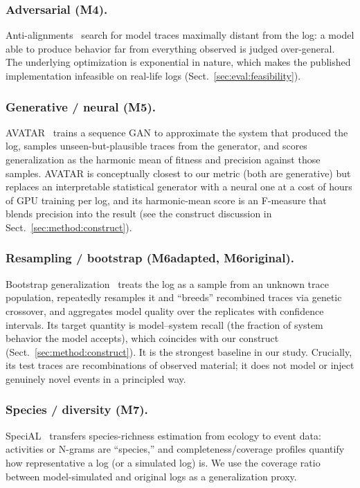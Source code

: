 \documentclass[runningheads]{llncs}
\begin{document}
\subsubsection{Adversarial (M4).}
Anti-alignments~\cite{vandongen2016anti} search for model traces maximally distant from the log: a model able to produce behavior far from everything observed is judged over-general. The underlying optimization is exponential in nature, which makes the published implementation infeasible on real-life logs (Sect.~\ref{sec:eval:feasibility}).

\subsubsection{Generative / neural (M5).}
AVATAR~\cite{theis2020avatar} trains a sequence GAN to approximate the system that produced the log, samples unseen-but-plausible traces from the generator, and scores generalization as the harmonic mean of fitness and precision against those samples. AVATAR is conceptually closest to our metric (both are generative) but replaces an interpretable statistical generator with a neural one at a cost of hours of GPU training per log, and its harmonic-mean score is an F-measure that blends precision into the result (see the construct discussion in Sect.~\ref{sec:method:construct}).

\subsubsection{Resampling / bootstrap (M6adapted, M6original).}
Bootstrap generalization~\cite{polyvyanyy2022bootstrap} treats the log as a sample from an unknown trace population, repeatedly resamples it and ``breeds'' recombined traces via genetic crossover, and aggregates model quality over the replicates with confidence intervals. Its target quantity is model--system recall (the fraction of system behavior the model accepts), which coincides with our construct (Sect.~\ref{sec:method:construct}). It is the strongest baseline in our study. Crucially, its test traces are recombinations of observed material; it does not model or inject genuinely novel events in a principled way.

\subsubsection{Species / diversity (M7).}
SpeciAL~\cite{kabierski2023species} transfers species-richness estimation from ecology to event data: activities or N-grams are ``species,'' and completeness/coverage profiles quantify how representative a log (or a simulated log) is. We use the coverage ratio between model-simulated and original logs as a generalization proxy.
\end{document}
